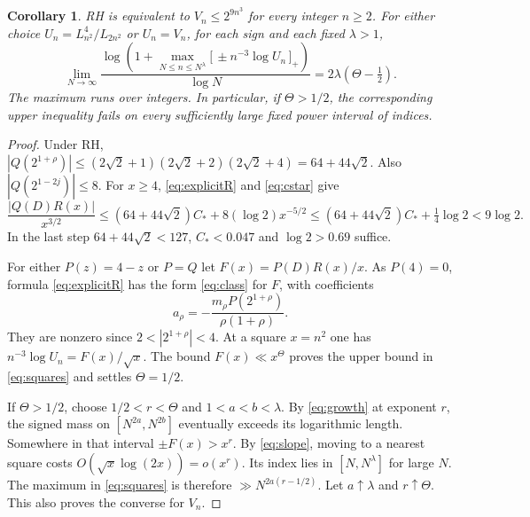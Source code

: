 \documentclass[11pt,a4paper]{article}
\newtheorem{corollary}[theorem]{Corollary}
\newcommand{\pos}[1]{\bigl[#1\bigr]_+}
\begin{document}
\begin{corollary}\label{cor:local}
RH is equivalent to $V_n\le 2^{9n^3}$ for every integer $n\ge2$. For either choice $U_n=L_{n^2}^4/L_{2n^2}$ or $U_n=V_n$, for each sign and each fixed $\lambda>1$,
\begin{equation}\label{eq:squares}
 \lim_{N\to\infty}
 \frac{\log\!\left(1+\displaystyle\max_{N\le n\le N^\lambda}
           \pos{\,\pm n^{-3}\log U_n\,}\right)}{\log N}
 =2\lambda(\Theta-\tfrac12).
\end{equation}
The maximum runs over integers. In particular, if $\Theta>1/2$, the corresponding upper inequality fails on every sufficiently large fixed power interval of indices.
\end{corollary}
\begin{proof}
Under RH, $|Q(2^{1+\rho})|\le(2\sqrt2+1)(2\sqrt2+2)(2\sqrt2+4)=64+44\sqrt2$. Also $|Q(2^{1-2j})|\le8$. For $x\ge4$, \eqref{eq:explicitR} and \eqref{eq:cstar} give
\[
 \frac{|Q(D)R(x)|}{x^{3/2}}
 \le (64+44\sqrt2)C_*+8(\log2)x^{-5/2}
 \le (64+44\sqrt2)C_*+\tfrac14\log2<9\log2.
\]
In the last step $64+44\sqrt2<127$, $C_*<0.047$ and $\log2>0.69$ suffice.

For either $P(z)=4-z$ or $P=Q$ let $F(x)=P(D)R(x)/x$. As $P(4)=0$, formula \eqref{eq:explicitR} has the form \eqref{eq:class} for $F$, with coefficients
\[
 a_\rho=-\frac{m_\rho P(2^{1+\rho})}{\rho(1+\rho)}.
\]
They are nonzero since $2<|2^{1+\rho}|<4$. At a square $x=n^2$ one has $n^{-3}\log U_n=F(x)/\sqrt x$. The bound $F(x)\ll x^\Theta$ proves the upper bound in \eqref{eq:squares} and settles $\Theta=1/2$.

If $\Theta>1/2$, choose $1/2<r<\Theta$ and $1<a<b<\lambda$. By \eqref{eq:growth} at exponent $r$, the signed mass on $[N^{2a},N^{2b}]$ eventually exceeds its logarithmic length. Somewhere in that interval $\pm F(x)>x^r$. By \eqref{eq:slope}, moving to a nearest square costs $O(\sqrt x\log(2x))=o(x^r)$. Its index lies in $[N,N^\lambda]$ for large $N$. The maximum in \eqref{eq:squares} is therefore $\gg N^{2a(r-1/2)}$. Let $a\uparrow\lambda$ and $r\uparrow\Theta$. This also proves the converse for $V_n$.
\end{proof}
\end{document}
